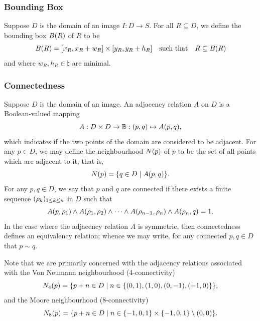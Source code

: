 \documentclass{article}
\begin{document}
\subsubsection*{Bounding Box}

Suppose $D$ is the domain of an image $I : D \to S$.
For all $R \subseteq D$, we define the bounding box $B(R)$ of $R$ to be
\begin{equation}
  \label{eq:def-bounding-box}
  B\lr{R}
  =
  \lrsq{x_{R}, x_{R} + w_{R}}
  \times
  \lrsq{y_{R}, y_{R} + h_{R}}
  \qq{such that}
  R \subseteq B\lr{R}
\end{equation}
and where $w_{R}, h_{R} \in \natural$ are minimal.

\subsubsection*{Connectedness}

Suppose $D$ is the domain of an image.
An adjacency relation $A$ on $D$ is a Boolean-valued mapping
\begin{equation}
  \label{eq:def-adjacency}
  A
  :
  D \times D \to \mathbb{B}
  :
  (p, q)
  \mapsto
  A(p, q)
  ,
\end{equation}
which indicates if the two points of the domain are considered to be adjacent.
For any $p \in D$, we may define the neighbourhood $N(p)$ of $p$ to be the
set of all points which are adjacent to it; that is,
\begin{equation}
  \label{eq:def-neighbourhood}
  N(p)
  =
  \lbrace
    q \in D
    \mid
    A(p, q)
  \rbrace
  .
\end{equation}
For any $p, q \in D$, we say that $p$ and $q$ are connected if there exists a
finite sequence $(\rho_{k})_{1 \leq k \leq n}$ in $D$ such that
\begin{equation}
  \label{eq:def-connected}
  A(p, \rho_{1})
  \wedge
  A(\rho_{1}, \rho_{2})
  \wedge
  \dotsb
  \wedge
  A(\rho_{n-1}, \rho_{n})
  \wedge
  A(\rho_{n}, q)
  =
  1
  .
\end{equation}
In the case where the adjacency relation $A$ is symmetric, then connectedness
defines an equivalency relation; whence we may write, for any connected
$p, q \in D$ that $p \sim q$.

Note that we are primarily concerned with the adjacency relations associated
with the Von Neumann neighbourhood (4-connectivity)
\begin{equation}
  \label{eq:def-neighbourhood-4}
  N_{4}(p)
  =
  \lbrace
    p + n \in D
    \mid
    n
    \in
    \lbrace
      (0, 1)
      ,
      (1, 0)
      ,
      (0, -1)
      ,
      (-1, 0)
    \rbrace
  \rbrace
  ,
\end{equation}
and the Moore neighbourhood (8-connectivity)
\begin{equation}
  \label{eq:def-neighbourhood-8}
  N_{8}(p)
  =
  \lbrace
    p + n \in D
    \mid
    n
    \in
    \lbrace-1, 0, 1\rbrace \times \lbrace-1, 0, 1\rbrace
    \setminus (0, 0)
  \rbrace
  .
\end{equation}
\end{document}
